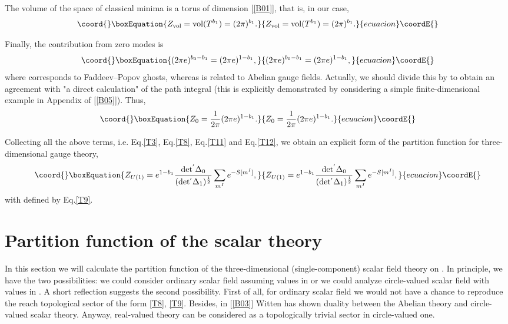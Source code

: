\documentclass[a4paper,12pt]{article}
\begin{document}
The volume of the space of classical minima is a torus of dimension
\coordHE{} [\ref{B01}], that is,
in our case,
\begin{equation}\coord{}\boxEquation{\label{T11}
Z_{\rm vol}={\rm vol}(T^{b_{1}})=(2\pi)^{b_{1}}.
}{Z_{\rm vol}={\rm vol}(T^{b_{1}})=(2\pi)^{b_{1}}.
}{ecuacion}\coordE{}\end{equation}

Finally, the contribution from zero modes is
\begin{equation}\coord{}\boxEquation{
(2\pi e)^{b_{0}-b_{1}}=(2\pi e)^{1-b_{1}},
}{
(2\pi e)^{b_{0}-b_{1}}=(2\pi e)^{1-b_{1}},
}{ecuacion}\coordE{}\end{equation}
where \coordHE{} corresponds to Faddeev--Popov ghosts, whereas \coordHE{} is related to Abelian gauge fields.
Actually, we should divide this by \myHighlight{$2\pi$}\coordHE{} to obtain an agreement
with "a direct calculation" of the path integral (this is
explicitly demonstrated by considering a simple finite-dimensional
example in Appendix of [\ref{B05}]).
Thus,
\begin{equation}\coord{}\boxEquation{\label{T12}
Z_{0}=\frac{1}{2\pi}(2\pi e)^{1-b_{1}}.
}{Z_{0}=\frac{1}{2\pi}(2\pi e)^{1-b_{1}}.
}{ecuacion}\coordE{}\end{equation}

Collecting all the above terms, i.e. Eq.\eqref{T3}, Eq.\eqref{T8}, Eq.\eqref{T11} and Eq.\eqref{T12}, we obtain an
explicit form of the partition function for three-dimensional \coordHE{} gauge theory,
\begin{equation}\coord{}\boxEquation{\label{T13}
Z_{ U(1) }= e^{1 - b_1 } \frac{ \rm det^{'} \Delta_{0} }
{(\rm det^{'}\Delta_{1})^\frac{1}{2} } \sum_{m^ {I} } e^{-S[m^{ I }] },
}{Z_{ U(1) }= e^{1 - b_1 } \frac{ \rm det^{'} \Delta_{0} }
{(\rm det^{'}\Delta_{1})^\frac{1}{2} } \sum_{m^ {I} } e^{-S[m^{ I }] },
}{ecuacion}\coordE{}\end{equation}
with \coordHE{} defined by Eq.\eqref{T9}.

\section{Partition function of the scalar theory}

In this section we will calculate the partition function of the
three-dimensional (single-component) scalar field theory on
\coordHE{}. In principle, we have the two possibilities: we
could consider ordinary scalar field assuming values in
\coordHE{} or we could analyze circle-valued scalar field with values in \coordHE{}.
A short reflection suggests the second possibility. First of all, for
ordinary scalar field we would not have a chance to reproduce the
reach topological sector of the form \eqref{T8}, \eqref{T9}. Besides, in [\ref{B03}]
Witten has shown duality between the Abelian theory and circle-valued
scalar theory. Anyway, real-valued theory can be considered as a
topologically trivial sector in circle-valued one.
\end{document}
